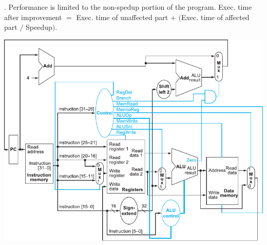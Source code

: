 \documentclass{slnotes}
\begin{document}
. Performance is limited to the non-spedup portion of the program. Exec. time after improvement \(=\) Exec. time of unaffected part \(+\) \((\)Exec. time of affected part \(/\) Speedup\()\).

\includegraphics[width=\columnwidth]{simple-mips-datapath.pdf}
\end{document}
